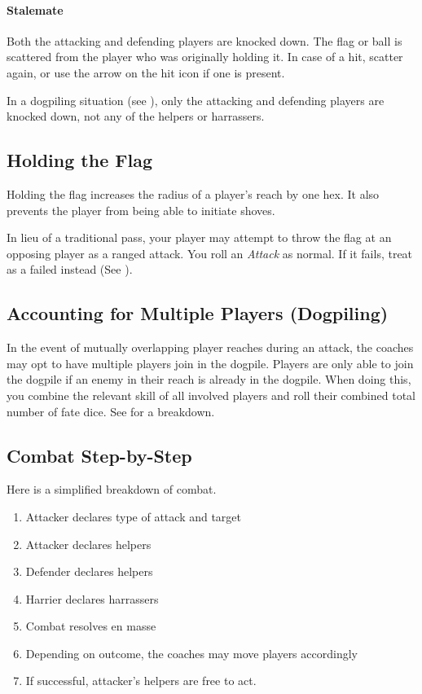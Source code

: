 \paragraph{Stalemate}
Both the attacking and defending players are knocked down.
The flag or ball is scattered from the player who was originally holding it.
In case of a hit, scatter again, or use the arrow on the hit icon if one is present.

\begin{note}
In a dogpiling situation (see ), only the attacking and defending players are knocked down, not any of the helpers or harrassers.
\end{note}

\subsection{Holding the Flag}
Holding the flag increases the radius of a player's reach by one hex.
It also prevents the player from being able to initiate shoves.

In lieu of a traditional pass, your player may attempt to throw the flag at an opposing player as a ranged attack.
You roll an \textit{Attack} as normal.
If it fails, treat as a failed \throw{} instead (See ).

\subsection{Accounting for Multiple Players (Dogpiling)}\label{dogpiling}
In the event of mutually overlapping player reaches during an attack, the coaches may opt to have multiple players join in the dogpile.
Players are only able to join the dogpile if an enemy in their reach is already in the dogpile.
When doing this, you combine the relevant skill of all involved players and roll their combined total number of fate dice. 
See  for a breakdown.

\subsection{Combat Step-by-Step}\label{combat-step-by-step}
Here is a simplified breakdown of combat.
\begin{enumerate}
    \item Attacker declares type of attack and target
    \item Attacker declares helpers
    \item Defender declares helpers
    \item Harrier declares harrassers
    \item Combat resolves en masse
    \item Depending on outcome, the coaches may move players accordingly
    \item If successful, attacker's helpers are free to act.
\end{enumerate}

